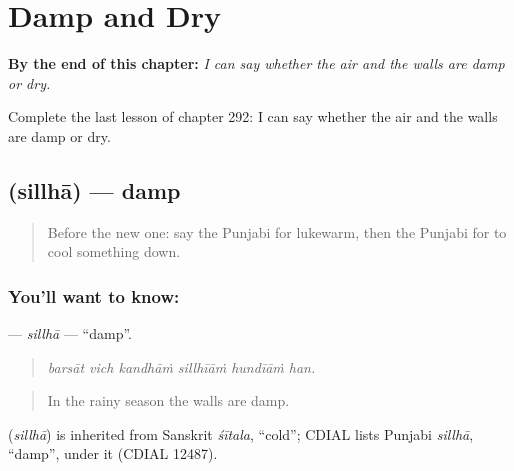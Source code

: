 
\chapter{Damp and Dry}
\label{ch:pa-a2-damp-and-dry}

\begin{chapteropening}
\textbf{By the end of this chapter:} \emph{I can say whether the air and the walls are damp or dry.}

Complete the last lesson of chapter 292: I can say whether the air and the walls are damp or dry.
\end{chapteropening}

\section[\texorpdfstring{\pa{ਸਿੱਲ੍ਹਾ} (sillhā)}{ਸਿੱਲ੍ਹਾ (sillhā)}]{ (sillhā) — damp}

\label{lesson:PA-C292-sillha}



\begin{quote}
Before the new one: say the Punjabi for lukewarm, then the Punjabi for to cool something down.
\end{quote}

\subsection*{You'll want to know: }
\textbf{} — \emph{sillhā} — \textquotedblleft{}damp\textquotedblright{}.

\begin{quote}
     
\end{quote}

\begin{quote}
\emph{barsāt vich kandhāṁ sillhīāṁ hundīāṁ han.}
\end{quote}

\begin{quote}
In the rainy season the walls are damp.
\end{quote}

\begin{cousinweb}
\textbf{} (\emph{sillhā}) is inherited from Sanskrit \emph{śītala}, \textquotedblleft{}cold\textquotedblright{}; CDIAL lists Punjabi \emph{sillhā}, \textquotedblleft{}damp\textquotedblright{}, under it (CDIAL 12487).
\end{cousinweb}

